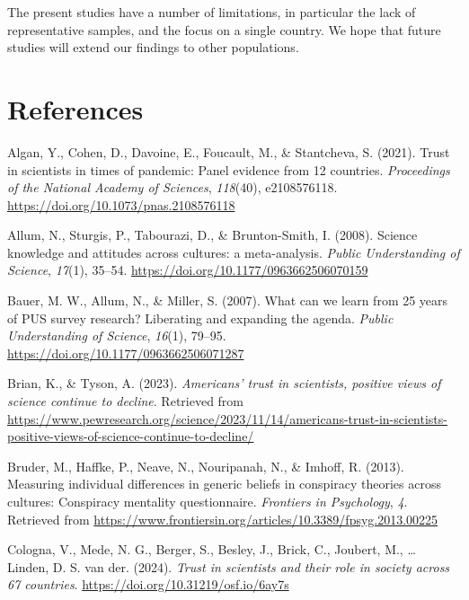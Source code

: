 \documentclass[
  doc,floatsintext]{apa6}
\newlength{\cslhangindent}
\newenvironment{CSLReferences}[2] %
 {\begin{list}{}{%
  \setlength{\itemindent}{0pt}
  \setlength{\leftmargin}{0pt}
  \setlength{\parsep}{0pt}
  \ifodd #1
   \setlength{\leftmargin}{\cslhangindent}
   \setlength{\itemindent}{-1\cslhangindent}
  \fi
  \setlength{\itemsep}{#2\baselineskip}}}
 {\end{list}}
\begin{document}
The present studies have a number of limitations, in particular the lack of representative samples, and the focus on a single country. We hope that future studies will extend our findings to other populations.

\FloatBarrier

\section{References}\label{references}

\label{refs}
\begin{CSLReferences}{1}{0}
Algan, Y., Cohen, D., Davoine, E., Foucault, M., \& Stantcheva, S. (2021). Trust in scientists in times of pandemic: Panel evidence from 12 countries. \emph{Proceedings of the National Academy of Sciences}, \emph{118}(40), e2108576118. \url{https://doi.org/10.1073/pnas.2108576118}

Allum, N., Sturgis, P., Tabourazi, D., \& Brunton-Smith, I. (2008). Science knowledge and attitudes across cultures: a meta-analysis. \emph{Public Understanding of Science}, \emph{17}(1), 35--54. \url{https://doi.org/10.1177/0963662506070159}

Bauer, M. W., Allum, N., \& Miller, S. (2007). What can we learn from 25 years of PUS survey research? Liberating and expanding the agenda. \emph{Public Understanding of Science}, \emph{16}(1), 79--95. \url{https://doi.org/10.1177/0963662506071287}

Brian, K., \& Tyson, A. (2023). \emph{Americans{'} trust in scientists, positive views of science continue to decline}. Retrieved from \url{https://www.pewresearch.org/science/2023/11/14/americans-trust-in-scientists-positive-views-of-science-continue-to-decline/}

Bruder, M., Haffke, P., Neave, N., Nouripanah, N., \& Imhoff, R. (2013). Measuring individual differences in generic beliefs in conspiracy theories across cultures: Conspiracy mentality questionnaire. \emph{Frontiers in Psychology}, \emph{4}. Retrieved from \url{https://www.frontiersin.org/articles/10.3389/fpsyg.2013.00225}

Cologna, V., Mede, N. G., Berger, S., Besley, J., Brick, C., Joubert, M., \ldots{} Linden, D. S. van der. (2024). \emph{Trust in scientists and their role in society across 67 countries}. \url{https://doi.org/10.31219/osf.io/6ay7s}


\end{CSLReferences}
\end{document}
